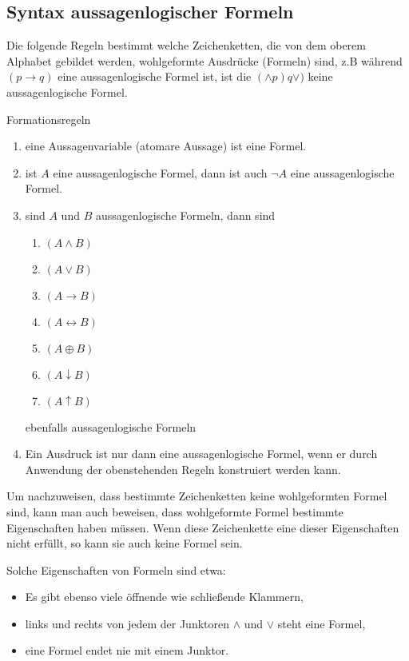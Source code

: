 \subsection{Syntax aussagenlogischer Formeln}
Die folgende Regeln bestimmt welche Zeichenketten, die von dem oberem Alphabet gebildet werden, wohlgeformte Ausdrücke (Formeln) sind, z.B während $(p \rightarrow q)$ eine aussagenlogische Formel ist, ist die $(\wedge p) q \vee)$ keine aussagenlogische Formel.
\begin{defi}\label{Definition 2.1} Formationsregeln\end{defi}
\begin{enumerate}
\item \label{formationsregeln_1}eine Aussagenvariable (atomare Aussage) ist eine Formel.
\item \label{formationsregeln_2}ist $A$ eine aussagenlogische Formel, dann ist auch $\neg A$ eine aussagenlogische Formel.
\item \label{formationsregeln_3}sind $A$ und $B$ aussagenlogische Formeln, dann sind
\begin{enumerate}
\item \label{formationsregeln_3_1}$(A \wedge B)$  
\item \label{formationsregeln_3_2} $(A \vee B)$  
\item $(A \rightarrow B)$   
\item $(A \leftrightarrow B)$      
\item $(A  \oplus B)$      
\item $(A \downarrow B)$      
\item $(A \uparrow B)$   
\end{enumerate}
ebenfalls aussagenlogische Formeln
\item \label{formationsregeln_4}Ein Ausdruck ist nur dann eine aussagenlogische Formel, wenn er durch Anwendung der oben­stehenden Regeln konstruiert werden kann.
\end{enumerate}

Um nachzuweisen, dass bestimmte Zeichenketten  keine wohlgeformten Formel sind, kann man auch beweisen, dass wohlgeformte Formel bestimmte Eigenschaften haben müssen. Wenn diese Zeichenkette eine dieser Eigenschaften nicht
erfüllt, so kann sie auch keine Formel sein.
\begin{bem}\label{AussagenEigenschaften}\cite{Dreiseitl}\end{bem} 
Solche Eigenschaften von Formeln sind etwa:
\begin{itemize}
\item Es gibt ebenso viele öffnende wie schließende Klammern,
\item links und rechts von jedem der Junktoren $\wedge$ und $\vee$ steht eine Formel,
\item eine Formel endet nie mit einem Junktor.
\end{itemize}

